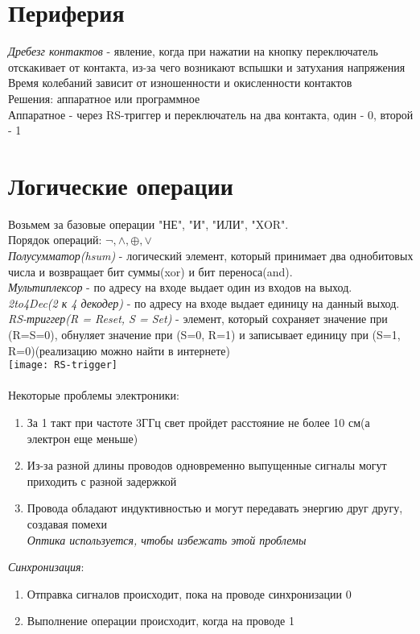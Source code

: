 \documentclass[12pt]{article}
\begin{document}
\section{Периферия}
\textit{Дребезг контактов} - явление, когда при нажатии на кнопку переключатель отскакивает от контакта, из-за чего возникают вспышки и затухания напряжения\\
Время колебаний зависит от изношенности и окисленности контактов\\
Решения: аппаратное или программное\\
Аппаратное - через RS-триггер и переключатель на два контакта, один - 0, второй - 1
\section{Логические операции}
Возьмем за базовые операции "НЕ", "И", "ИЛИ", "XOR".\\
Порядок операций: $\lnot, \land, \oplus, \lor$\\
\textit{Полусумматор(hsum)} - логический элемент, который принимает два однобитовых числа и возвращает бит суммы(xor) и бит переноса(and).\\
\textit{Мультиплексор} - по адресу на входе выдает один из входов на выход.\\
\textit{2to4Dec(2 к 4 декодер)} - по адресу на входе выдает единицу на данный выход.\\
\textit{RS-триггер(R = Reset, S = Set)} - элемент, который сохраняет значение при (R=S=0), обнуляет значение при (S=0, R=1) и записывает единицу при (S=1, R=0)(реализацию можно найти в интернете)\\
\texttt{[image: RS-trigger]}\\\\
Некоторые проблемы электроники:
\begin{enumerate}
    \item За 1 такт при частоте 3ГГц свет пройдет расстояние не более 10 см(а электрон еще меньше)
    \item Из-за разной длины проводов одновременно выпущенные сигналы могут приходить с разной задержкой
    \item Провода обладают индуктивностью и могут передавать энергию друг другу, создавая помехи\\
    \textit{Оптика используется, чтобы избежать этой проблемы}
\end{enumerate}
\textit{Синхронизация}:
\begin{enumerate}
    \item Отправка сигналов происходит, пока на проводе синхронизации 0
    \item Выполнение операции происходит, когда на проводе 1
\end{enumerate}
\end{document}
